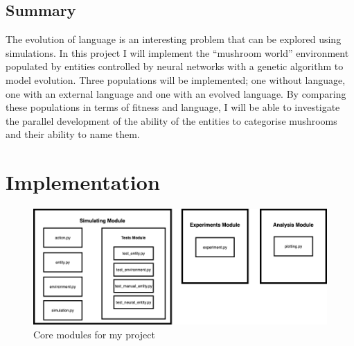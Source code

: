 \documentclass[12pt,a4paper,twoside,openright]{report}
\begin{document}
\section{Summary}\label{section:summary}

The evolution of language is an interesting problem that can be explored using simulations. In this project I will implement the ``mushroom world'' environment populated by entities controlled by neural networks with a genetic algorithm to model evolution. Three populations will be implemented; one without language, one with an external language and one with an evolved language. By comparing these populations in terms of fitness and language, I will be able to investigate the parallel development of the ability of the entities to categorise mushrooms and their ability to name them.


\chapter{Implementation}

\begin{figure}[t]
  \centering
  \includegraphics[width=.9\linewidth]{figs/modules}
  \caption{Core modules for my project}
  \label{fig:modules}
\end{figure}
\end{document}
